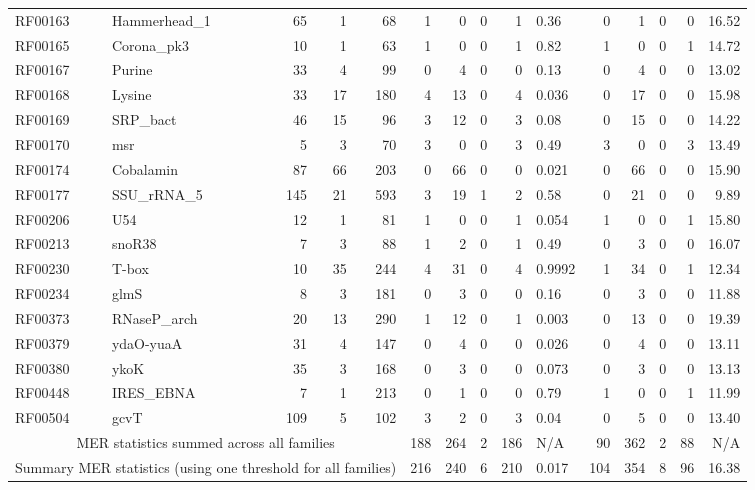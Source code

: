 \documentclass[11pt]{article}
\begin{document}
\begin{table}
\begin{center}
\begin{tabular}{|ll|rrr|rrrrl|rrrrr|}
RF00163 & Hammerhead\_1 & 65 & 1 & 68 & 1 & 0 & 0 & 1 &   0.36 & 0 & 1 & 0 & 0 &  16.52 \\  
RF00165 & Corona\_pk3 & 10 & 1 & 63 & 1 & 0 & 0 & 1 &   0.82 & 1 & 0 & 0 & 1 &  14.72 \\  
RF00167 & Purine & 33 & 4 & 99 & 0 & 4 & 0 & 0 &   0.13 & 0 & 4 & 0 & 0 &  13.02 \\  
RF00168 & Lysine & 33 & 17 & 180 & 4 & 13 & 0 & 4 &  0.036 & 0 & 17 & 0 & 0 &  15.98 \\  
RF00169 & SRP\_bact & 46 & 15 & 96 & 3 & 12 & 0 & 3 &   0.08 & 0 & 15 & 0 & 0 &  14.22 \\  
RF00170 & msr & 5 & 3 & 70 & 3 & 0 & 0 & 3 &   0.49 & 3 & 0 & 0 & 3 &  13.49 \\  
RF00174 & Cobalamin & 87 & 66 & 203 & 0 & 66 & 0 & 0 &  0.021 & 0 & 66 & 0 & 0 &   15.90 \\  
RF00177 & SSU\_rRNA\_5 & 145 & 21 & 593 & 3 & 19 & 1 & 2 &   0.58 & 0 & 21 & 0 & 0 &   9.89 \\  
RF00206 & U54 & 12 & 1 & 81 & 1 & 0 & 0 & 1 &  0.054 & 1 & 0 & 0 & 1 &   15.80 \\  
RF00213 & snoR38 & 7 & 3 & 88 & 1 & 2 & 0 & 1 &   0.49 & 0 & 3 & 0 & 0 &  16.07 \\  
RF00230 & T-box & 10 & 35 & 244 & 4 & 31 & 0 & 4 & 0.9992 & 1 & 34 & 0 & 1 &  12.34 \\  
RF00234 & glmS & 8 & 3 & 181 & 0 & 3 & 0 & 0 &   0.16 & 0 & 3 & 0 & 0 &  11.88 \\  
RF00373 & RNaseP\_arch & 20 & 13 & 290 & 1 & 12 & 0 & 1 &  0.003 & 0 & 13 & 0 & 0 &  19.39 \\  
RF00379 & ydaO-yuaA & 31 & 4 & 147 & 0 & 4 & 0 & 0 &  0.026 & 0 & 4 & 0 & 0 &  13.11 \\  
RF00380 & ykoK & 35 & 3 & 168 & 0 & 3 & 0 & 0 &  0.073 & 0 & 3 & 0 & 0 &  13.13 \\  
RF00448 & IRES\_EBNA & 7 & 1 & 213 & 0 & 1 & 0 & 0 &   0.79 & 1 & 0 & 0 & 1 &  11.99 \\  
RF00504 & gcvT & 109 & 5 & 102 & 3 & 2 & 0 & 3 &   0.04 & 0 & 5 & 0 & 0 &   13.40 \\ \hline 
\multicolumn{5}{|c|}{MER statistics summed across all families} & 188
& 264 & 2 & 186 & N/A & 90 & 362 & 2 & 88 & N/A \\  
\multicolumn{5}{|c|}{Summary MER statistics (using one threshold for
all families)} & 216 & 240 & 6 & 210 &  0.017 & 104 & 354 & 8 & 96 &  16.38 \\ \hline 
\end{tabular}
\end{center}


\end{table}
\end{document}
